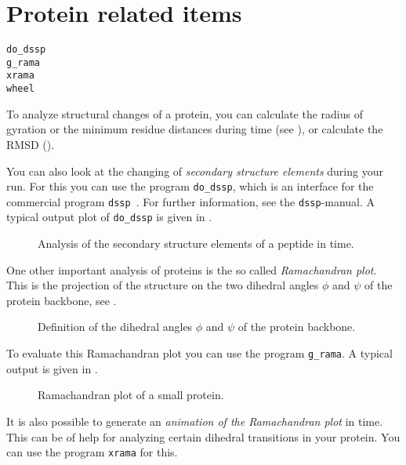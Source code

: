 %

\section{Protein related items}
\begin{verbatim}
do_dssp
g_rama
xrama
wheel
\end{verbatim}
To analyze structural changes of a protein, you can calculate the radius of 
gyration or the minimum residue distances during time 
(see ), or calculate the RMSD ().

You can also look at the changing of {\em secondary structure elements} 
during your run. For this you can use the program {\tt do\_dssp}, which is 
an interface for the commercial program {\tt dssp}~\cite{Kabsch83}. For 
further information, see the {\tt dssp}-manual. A typical output plot of 
{\tt do\_dssp} is given in .

\begin{figure}
\centerline{
}
\caption{Analysis of the secondary structure elements of a peptide in time.}
\label{fig:dssp}
\end{figure}

One other important analysis of proteins is the so called 
{\em Ramachandran plot}. 
This is the projection of the structure on the two dihedral angles $\phi$ and 
$\psi$ of the protein backbone, see .

\begin{figure}
\centerline{
}
\caption{Definition of the dihedral angles $\phi$ and $\psi$ of the protein backbone.}
\label{fig:phipsi}
\end{figure}

To evaluate this Ramachandran plot you can use the program {\tt g\_rama}. 
A typical output is given in .

\begin{figure}
\centerline{
{}}
\caption{Ramachandran plot of a small protein.}
\label{fig:rama}
\end{figure}

It is also possible to generate an {\em animation of the Ramachandran plot} 
in time. This can be of help for analyzing certain dihedral transitions 
in your protein. You can use the program {\tt xrama} for this.

